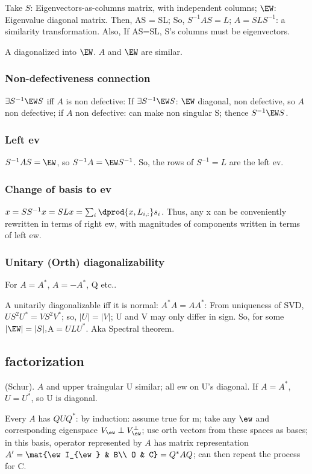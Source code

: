 \documentclass[oneside, article]{memoir}
\begin{document}
Take $S$: Eigenvectors-as-columns matrix, with independent columns; $\EW$: Eigenvalue diagonal matrix. Then, AS = SL; So, $S^{-1}AS = L$; $A=SLS^{-1}$: a similarity transformation. Also, If AS=SL, S's columns must be eigenvectors.

A diagonalized into $\EW$. $A$ and $\EW$ are similar.

\subsubsection{Non-defectiveness connection}
$\exists S^{-1}\EW S$ iff $A$ is non defective: If $\exists S^{-1}\EW S$: $\EW$ diagonal, non defective, so $A$ non defective; if $A$ non defective: can make non singular S; thence $S^{-1}\EW S$.

\subsubsection{Left ev}
$S^{-1}AS = \EW$, so $S^{-1}A = \EW S^{-1}$. So, the rows of $S^{-1} = L$ are the left ev.

\subsubsection{Change of basis to ev}
$x = SS^{-1}x = SLx = \sum_i \dprod{x, L_{i, :}} s_i$. Thus, any x can be conveniently rewritten in terms of right ew, with magnitudes of components written in terms of left ew.

\subsubsection{Unitary (Orth) diagonalizability}
For $A=A^{*}$, $A=-A^{*}$, Q etc..

A unitarily diagonalizable iff it is normal: $A^{*}A = AA^{*}$: From uniqueness of SVD, $US^{2}U^{*} = VS^{2}V^{*}$; so, $|U| = |V|$; U and V may only differ in sign. So, for some $|\EW| = |S|, $A$ = ULU^{*}$. Aka Spectral theorem.

\subsection{ factorization}
(Schur). $A$ and upper traingular U similar; all ew on U's diagonal. If $A=A^{*}$, $U=U^{*}$, so U is diagonal.

Every $A$ has $QUQ^{*}$: by induction: assume true for m; take any $\ew$ and corresponding eigenspace $V_{\ew} \perp V_{\ew}^{\perp}$; use orth vectors from these spaces as bases; in this basis, operator represented by $A$ has matrix representation $A'=\mat{\ew I_{\ew} & B\\ O & C} = Q^{*}AQ$; can then repeat the process for C.
\end{document}
